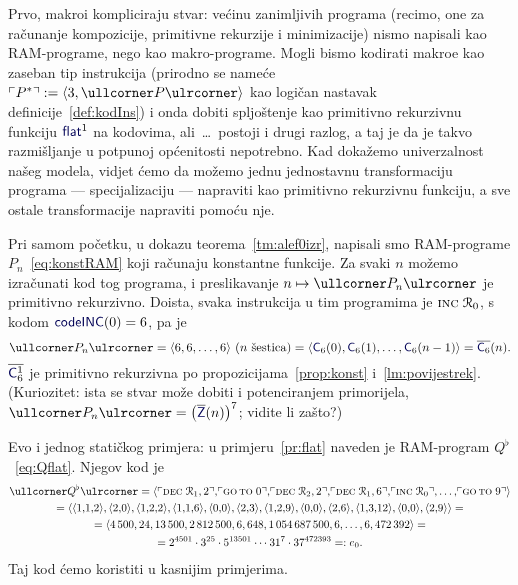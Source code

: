 Prvo, makroi kompliciraju stvar: većinu zanimljivih programa (recimo, one za računanje kompozicije, primitivne rekurzije i minimizacije) nismo napisali kao RAM-programe, nego kao makro-programe. Mogli bismo kodirati makroe kao zaseban tip instrukcija (prirodno se nameće $\kins{P^*}:=\langle3,\kprog{P}\rangle$ kao logičan nastavak definicije~\ref{def:kodIns}) i onda dobiti spljoštenje kao primitivno rekurzivnu funkciju $\f{flat}^1$ na kodovima, ali~\ldots\ postoji i drugi razlog, a taj je da je takvo razmišljanje u potpunoj općenitosti nepotrebno. Kad dokažemo univerzalnost našeg modela, vidjet ćemo da možemo jednu jednostavnu transformaciju programa --- specijalizaciju --- napraviti kao primitivno rekurzivnu funkciju, a sve ostale transformacije napraviti pomoću nje.


\begin{primjer}[{name=[primitivna rekurzivnost generatora koda za konstantne funkcije]}]\label{pr:kodkonst}
Pri samom početku, u dokazu teorema~\ref{tm:alef0izr}, napisali smo RAM-pro\-gra\-me $P_n$~\eqref{eq:konstRAM} koji računaju konstantne funkcije. Za svaki $n$ možemo izračunati kod tog programa, i preslikavanje $n\mapsto\kprog{P_n}$ je primitivno rekurzivno. Doista, svaka instrukcija u tim programima je $\textsc{inc}\;\mathcal R_{0}$, s kodom $\f{codeINC}(0)=6$, pa je
\begin{equation}
    \kprog{P_n}=\langle6,6,\dotsc,6\rangle\text{ ($n$ šestica)}=\langle \f C_6(0),\f C_6(1),\dotsc,\f C_6(n-1)\rangle=\overline{\f C_6}(n)\text.
\end{equation}
$\overline{\f C_6^1}$ je primitivno rekurzivna po propozicijama~\ref{prop:konst} i~\ref{lm:povijestrek}.
(Kuriozitet: ista se stvar može dobiti i potenciranjem primorijela, $\kprog{P_n}=\bigl(\overline{\f Z}(n)\bigr)^7$\!; vidite li zašto?)
\end{primjer}

\begin{primjer}[{name=[kod spljoštenja programa $Q$]}]\label{pr:Qflatkod}
Evo i jednog statičkog primjera: u primjeru~\ref{pr:flat} naveden je RAM-program $Q^\flat$~\eqref{eq:Qflat}. Njegov kod je
\begin{multline}
    \kprog{Q^\flat}=\langle\kins{\decr12},\!\kins{\goto\;0},\!\kins{\decr22},\!\kins{\decr16},\!\kins{\incr0},\dotsc,\!\kins{\goto\;9}\rangle\\
    =\langle\langle1,\!1,\!2\rangle,\langle2,\!0\rangle,\langle1,\!2,\!2\rangle,\langle1,\!1,\!6\rangle,\langle0,\!0\rangle,\langle2,\!3\rangle,\langle1,\!2,\!9\rangle,\langle0,\!0\rangle,\langle2,\!6\rangle,\langle1,\!3,\!12\rangle,\langle0,\!0\rangle,\langle2,\!9\rangle\rangle=\\
    =\langle4\,500,24,13\,500,2\,812\,500,6,648,1\,054\,687\,500,6,\dotsc,6,472\,392\rangle=\\
    =2^{4501}\cdot3^{25}\cdot5^{13501}\mathbin{\dotsm}31^7\cdot37^{472393}=:e_0\text.
\end{multline}
Taj kod ćemo koristiti u kasnijim primjerima.
\end{primjer}

